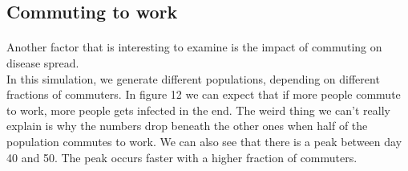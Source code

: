 \documentclass[runningheads]{llncs}
\begin{document}
\subsection{Commuting to work}

\paragraph{} Another factor that is interesting to examine is the impact of commuting on disease spread. \\
In this simulation, we generate different populations, depending on different fractions of commuters. In figure 12 we can expect that if more people commute to work, more people gets infected in the end. The weird thing we can't really explain is why the numbers drop beneath the other ones when half of the population commutes to work. We can also see that there is a peak between day 40 and 50. The peak occurs faster with a higher fraction of commuters. 
\end{document}
